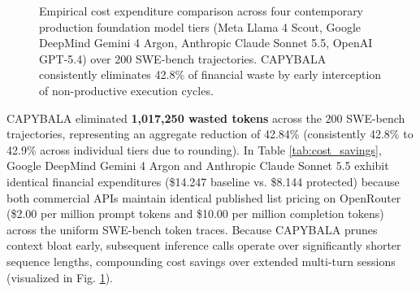 \documentclass[journal]{IEEEtran}
\begin{document}
\begin{figure}[!t]
\centering
{}
\caption{Empirical cost expenditure comparison across four contemporary production foundation model tiers (Meta Llama 4 Scout, Google DeepMind Gemini 4 Argon, Anthropic Claude Sonnet 5.5, OpenAI GPT-5.4) over 200 SWE-bench trajectories. CAPYBALA consistently eliminates 42.8\% of financial waste by early interception of non-productive execution cycles.}
\label{fig:cost_bar_chart}
\end{figure}

CAPYBALA eliminated \textbf{1,017,250 wasted tokens} across the 200 SWE-bench trajectories, representing an aggregate reduction of 42.84\% (consistently 42.8\% to 42.9\% across individual tiers due to rounding). In Table \ref{tab:cost_savings}, Google DeepMind Gemini 4 Argon and Anthropic Claude Sonnet 5.5 exhibit identical financial expenditures (\$14.247 baseline vs. \$8.144 protected) because both commercial APIs maintain identical published list pricing on OpenRouter (\$2.00 per million prompt tokens and \$10.00 per million completion tokens) across the uniform SWE-bench token traces. Because CAPYBALA prunes context bloat early, subsequent inference calls operate over significantly shorter sequence lengths, compounding cost savings over extended multi-turn sessions (visualized in Fig. \ref{fig:cost_bar_chart}).
\end{document}
